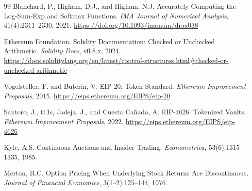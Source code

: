 \begin{thebibliography}{99}
Blanchard, P., Higham, D.J., and Higham, N.J.
\newblock Accurately Computing the Log-Sum-Exp and Softmax Functions.
\newblock \emph{IMA Journal of Numerical Analysis}, 41(4):2311--2330, 2021.
\newblock \url{https://doi.org/10.1093/imanum/draa038}

Ethereum Foundation.
\newblock Solidity Documentation: Checked or Unchecked Arithmetic.
\newblock \emph{Solidity Docs}, v0.8.x, 2024.
\newblock \url{https://docs.soliditylang.org/en/latest/control-structures.html#checked-or-unchecked-arithmetic}


Vogelsteller, F. and Buterin, V.
\newblock EIP-20: Token Standard.
\newblock \emph{Ethereum Improvement Proposals}, 2015.
\newblock \url{https://eips.ethereum.org/EIPS/eip-20}

Santoro, J., t11s, Jadeja, J., and Cuesta Ca\~{n}ada, A.
\newblock EIP-4626: Tokenized Vaults.
\newblock \emph{Ethereum Improvement Proposals}, 2022.
\newblock \url{https://eips.ethereum.org/EIPS/eip-4626}


Kyle, A.S.
\newblock Continuous Auctions and Insider Trading.
\newblock \emph{Econometrica}, 53(6):1315--1335, 1985.

Merton, R.C.
\newblock Option Pricing When Underlying Stock Returns Are Discontinuous.
\newblock \emph{Journal of Financial Economics}, 3(1--2):125--144, 1976.

\end{thebibliography}
